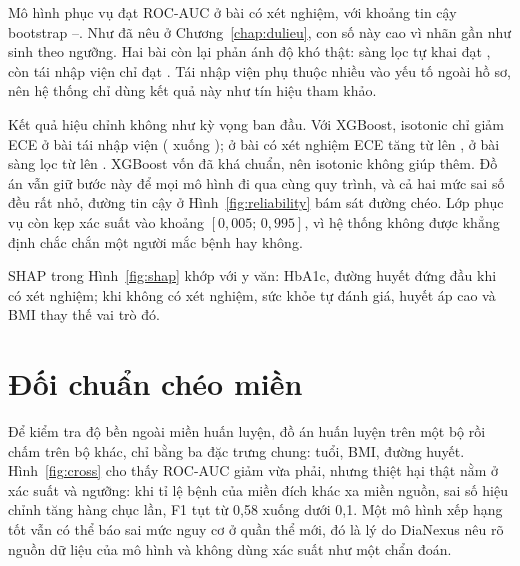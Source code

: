 
Mô hình phục vụ đạt ROC-AUC  ở bài có xét nghiệm, với khoảng tin cậy bootstrap --. Như đã nêu ở Chương~\ref{chap:dulieu}, con số này cao vì nhãn gần như sinh theo ngưỡng. Hai bài còn lại phản ánh độ khó thật: sàng lọc tự khai đạt , còn tái nhập viện chỉ đạt . Tái nhập viện phụ thuộc nhiều vào yếu tố ngoài hồ sơ, nên hệ thống chỉ dùng kết quả này như tín hiệu tham khảo.


Kết quả hiệu chỉnh không như kỳ vọng ban đầu. Với XGBoost, isotonic chỉ giảm ECE ở bài tái nhập viện ( xuống ); ở bài có xét nghiệm ECE tăng từ  lên , ở bài sàng lọc từ  lên . XGBoost vốn đã khá chuẩn, nên isotonic không giúp thêm. Đồ án vẫn giữ bước này để mọi mô hình đi qua cùng quy trình, và cả hai mức sai số đều rất nhỏ, đường tin cậy ở Hình~\ref{fig:reliability} bám sát đường chéo. Lớp phục vụ còn kẹp xác suất vào khoảng \([0{,}005;\,0{,}995]\), vì hệ thống không được khẳng định chắc chắn một người mắc bệnh hay không.



SHAP trong Hình~\ref{fig:shap} khớp với y văn: HbA1c, đường huyết đứng đầu khi có xét nghiệm; khi không có xét nghiệm, sức khỏe tự đánh giá, huyết áp cao và BMI thay thế vai trò đó.

\section{Đối chuẩn chéo miền}\label{sec:crossdomain}

Để kiểm tra độ bền ngoài miền huấn luyện, đồ án huấn luyện trên một bộ rồi chấm trên bộ khác, chỉ bằng ba đặc trưng chung: tuổi, BMI, đường huyết. Hình~\ref{fig:cross} cho thấy ROC-AUC giảm vừa phải, nhưng thiệt hại thật nằm ở xác suất và ngưỡng: khi tỉ lệ bệnh của miền đích khác xa miền nguồn, sai số hiệu chỉnh tăng hàng chục lần, F1 tụt từ 0,58 xuống dưới 0,1. Một mô hình xếp hạng tốt vẫn có thể báo sai mức nguy cơ ở quần thể mới, đó là lý do DiaNexus nêu rõ nguồn dữ liệu của mô hình và không dùng xác suất như một chẩn đoán.

